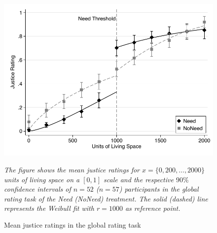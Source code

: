 \documentclass[12pt]{scrartcl}
\begin{document}
\begin{figure}[ht!]
   \centering
   \includegraphics{figures/figure_9.pdf}
   \begin{minipage}{\linewidth}
      \footnotesize
      \textit{The figure shows the mean justice ratings for $x=\{0,200,\ldots,2000\}$ units of living space on a $[0,1]$ scale and the respective $90\%$ confidence intervals of $n=52$ ($n=57$) participants in the global rating task of the Need (NoNeed) treatment. The solid (dashed) line represents the Weibull fit with $r=1000$ as reference point.}
   \end{minipage}
   \caption{Mean justice ratings in the global rating task}
   \label{fig:figure_9}
\end{figure}
\end{document}
